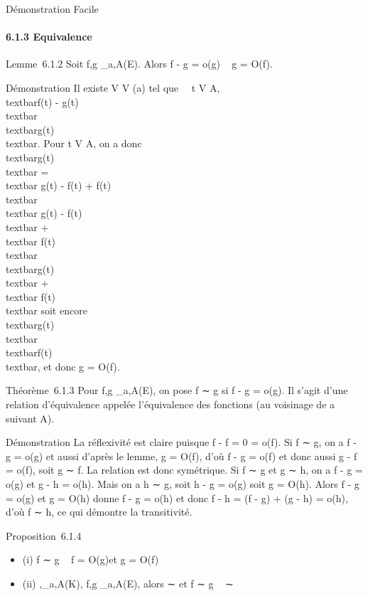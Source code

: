 \documentclass[]{article}
\begin{document}
Démonstration Facile

\paragraph{6.1.3 Equivalence}

Lemme~6.1.2 Soit f,g \_a,A(E). Alors f - g = o(g) \rigtharrow~ g = O(f).

Démonstration Il existe V \in V (a) tel que \forall~~t \in
V \bigcap A, \\textbar{}f(t) - g(t)\\textbar{}
 
\\textbar{}g(t)\\textbar{}. Pour t \in V \bigcap
A, on a donc \\textbar{}g(t)\\textbar{}
=\\textbar{} g(t) - f(t) + f(t)\\textbar{}
\leq\\textbar{} g(t) - f(t)\\textbar{}
+\\textbar{} f(t)\\textbar{} 
\\textbar{}g(t)\\textbar{}
+\\textbar{} f(t)\\textbar{} soit encore
\\textbar{}g(t)\\textbar{} \\textbar{}f(t)\\textbar{}, et donc g =
O(f).

Théorème~6.1.3 Pour f,g \_a,A(E), on pose f ∼ g si f - g =
o(g). Il s'agit d'une relation d'équivalence appelée l'équivalence des
fonctions (au voisinage de a suivant A).

Démonstration La réflexivité est claire puisque f - f = 0 = o(f). Si f ∼
g, on a f - g = o(g) et aussi d'après le lemme, g = O(f), d'où f - g =
o(f) et donc aussi g - f = o(f), soit g ∼ f. La relation est donc
symétrique. Si f ∼ g et g ∼ h, on a f - g = o(g) et g - h = o(h). Mais
on a h ∼ g, soit h - g = o(g) soit g = O(h). Alors f - g = o(g) et g =
O(h) donne f - g = o(h) et donc f - h = (f - g) + (g - h) = o(h), d'où f
∼ h, ce qui démontre la transitivité.

Proposition~6.1.4

\begin{itemize}
\itemsep1pt\parskip0pt
\item
  (i) f ∼ g \rigtharrow~ f = O(g)\text et g = O(f)
\item
  (ii) \phi,\psi {}\_a,A(K), f,g \_a,A(E), alors \phi ∼
  \psi\text et f ∼ g \rigtharrow~ \phif ∼ \psig
\end{itemize}
\end{document}
